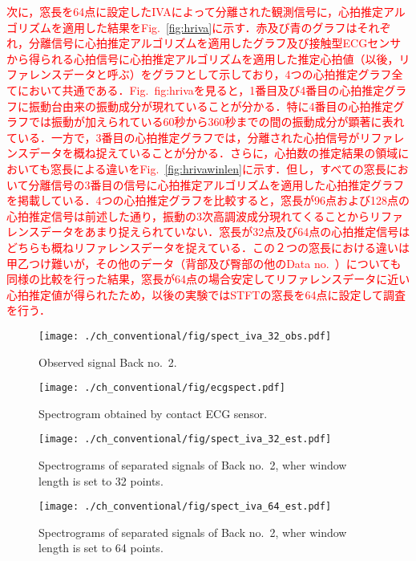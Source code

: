 \textcolor{red}{次に，窓長を64点に設定したIVAによって分離された観測信号に，心拍推定アルゴリズムを適用した結果をFig.~\ref{fig:hriva}に示す．赤及び青のグラフはそれぞれ，分離信号に心拍推定アルゴリズムを適用したグラフ及び接触型ECGセンサから得られる心拍信号に心拍推定アルゴリズムを適用した推定心拍値（以後，リファレンスデータと呼ぶ）をグラフとして示しており，4つの心拍推定グラフ全てにおいて共通である．Fig.~{fig:hriva}を見ると，1番目及び4番目の心拍推定グラフに振動台由来の振動成分が現れていることが分かる．特に4番目の心拍推定グラフでは振動が加えられている60秒から360秒までの間の振動成分が顕著に表れている．一方で，3番目の心拍推定グラフでは，分離された心拍信号がリファレンスデータを概ね捉えていることが分かる．さらに，心拍数の推定結果の領域においても窓長による違いをFig.~\ref{fig:hrivawinlen}に示す．但し，すべての窓長において分離信号の3番目の信号に心拍推定アルゴリズムを適用した心拍推定グラフを掲載している．4つの心拍推定グラフを比較すると，窓長が96点および128点の心拍推定信号は前述した通り，振動の3次高調波成分現れてくることからリファレンスデータをあまり捉えられていない．窓長が32点及び64点の心拍推定信号はどちらも概ねリファレンスデータを捉えている．この２つの窓長における違いは甲乙つけ難いが，その他のデータ（背部及び臀部の他のData no.~）についても同様の比較を行った結果，窓長が64点の場合安定してリファレンスデータに近い心拍推定値が得られたため，以後の実験ではSTFTの窓長を64点に設定して調査を行う．}


\begin{figure}[tb]
\centering
\texttt{[image: ./ch\_conventional/fig/spect\_iva\_32\_obs.pdf]}
\caption{Observed signal Back no.~2.}
\label{fig:siva32obs}
\end{figure}

\begin{figure}[tb]
\centering
\texttt{[image: ./ch\_conventional/fig/ecgspect.pdf]}
\caption{Spectrogram obtained by contact ECG sensor.}
\label{fig:ecgspect}
\end{figure}

\begin{figure}[tb]
\centering
\texttt{[image: ./ch\_conventional/fig/spect\_iva\_32\_est.pdf]}
\caption{Spectrograms of separated signals of Back no.~2, wher window length is set to 32 points.}
\label{fig:siva32est}
\end{figure}

\begin{figure}[tb]
\centering
\texttt{[image: ./ch\_conventional/fig/spect\_iva\_64\_est.pdf]}
\caption{Spectrograms of separated signals of Back no.~2, wher window length is set to 64 points.}
\label{fig:siva64est}
\end{figure}

